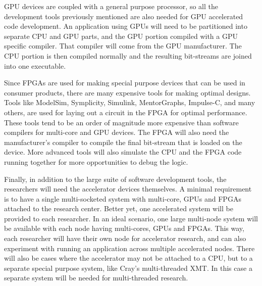 GPU devices are coupled with a general purpose processor, so all the development tools previously mentioned are also needed for GPU accelerated code development. An application using GPUs will need to be partitioned into separate CPU and GPU parts, and the GPU portion compiled with a GPU specific compiler. That compiler will come from the GPU manufacturer. The CPU portion is then compiled normally and the resulting bit-streams are joined into one executable.

Since FPGAs are used for making special purpose devices that can be used in consumer products, there are many expensive tools for making optimal designs. Tools like ModelSim, Symplicity, Simulink, MentorGraphs, Impulse-C, and many others, are used for laying out a circuit in the FPGA for optimal performance. These tools tend to be an order of magnitude more expensive than software compilers for multi-core and GPU devices. The FPGA will also need the manufacturer’s compiler to compile the final bit-stream that is loaded on the device. More advanced tools will also simulate the CPU and the FPGA code running together for more opportunities to debug the logic.

Finally, in addition to the large suite of software development tools, the researchers will need the accelerator devices themselves. A minimal requirement is to have a single multi-socketed system with multi-core, GPUs and FPGAs attached to the research center. Better yet, one accelerated system will be provided to each researcher. In an ideal scenario, one large multi-node system will be available with each node having multi-cores, GPUs and FPGAs. This way, each researcher will have their own node for accelerator research, and can also experiment with running an application across multiple accelerated nodes. There will also be cases where the accelerator may not be attached to a CPU, but to a separate
special purpose system, like Cray’s multi-threaded XMT. In this case a separate system will be needed for multi-threaded research.
